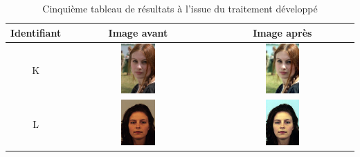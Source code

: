 \documentclass[11pt, french,screen]{report-rd-info}
\begin{document}
\begin{table}
\centering
\begin{tabular}{|c|c|c|}	
   \hline \textbf{Identifiant}  &  \textbf{Image avant}  &  \textbf{Image après} \\ \hline 
   K & \includegraphics[width=0.25\textwidth]{Resultats/pk_avant} & \includegraphics[width=0.25\textwidth]{Resultats/pk_apres} \\ \hline   
   L & \includegraphics[width=0.25\textwidth]{Resultats/pl_avant} & \includegraphics[width=0.25\textwidth]{Resultats/pl_apres} \\ \hline   
\end{tabular}
\caption{Cinquième tableau de résultats à l'issue du traitement développé}
\label{tab:Resultats5}
\end{table}
\end{document}
